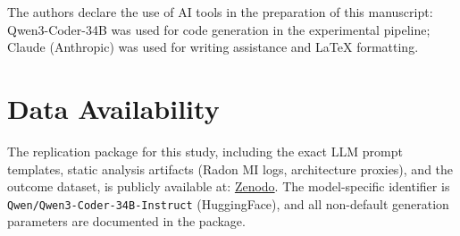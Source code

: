 \documentclass[sigconf,review,anonymous]{acmart}
\begin{document}
\begin{acks}
The authors declare the use of AI tools in the preparation of this manuscript: Qwen3-Coder-34B was used for code generation in the experimental pipeline; Claude (Anthropic) was used for writing assistance and LaTeX formatting.
\end{acks}

\section*{Data Availability}

The replication package for this study, including the exact LLM prompt templates, static analysis artifacts (Radon MI logs, architecture proxies), and the outcome dataset, is publicly available at: \href{https://zenodo.org/records/20547119?token=eyJhbGciOiJIUzUxMiJ9.eyJpZCI6ImI0MmIzODE2LTMzMjgtNGRlYi1hNzA3LWVkMzlkMjhmZDg5NSIsImRhdGEiOnt9LCJyYW5kb20iOiI5NTIxZTg5YmIxZmM0ZGJmNGYwMzQzZDBkODk5NjY0OSJ9.P260LQG5q0QhuY-KJ7rkhC5Pq0Xpnu5ywdNOCWq2PuVqB0g3l0s8o3M6PhZJFBNEpGGjJRoAx4oZ351grRPyCw}{Zenodo}. The model-specific identifier is \texttt{Qwen/Qwen3-Coder-34B-Instruct} (HuggingFace), and all non-default generation parameters are documented in the package.

\end{document}
